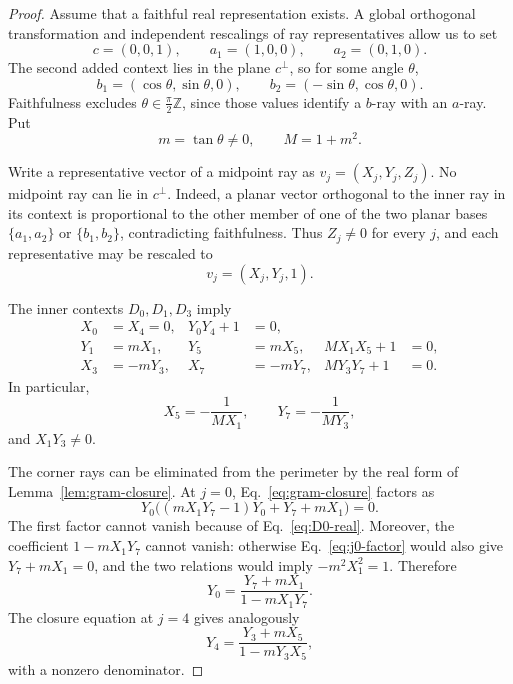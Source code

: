 \documentclass[12pt,a4paper]{article}
\theoremstyle{definition}
\theoremstyle{remark}
\begin{document}
\begin{proof}
Assume that a faithful real representation exists.  A global orthogonal
transformation and independent rescalings of ray representatives allow
us to set
\begin{equation}
 c=(0,0,1),\qquad a_1=(1,0,0),\qquad a_2=(0,1,0).
 \label{eq:real-normal-a}
\end{equation}
The second added context lies in the plane $c^\perp$, so for some angle
$\theta$,
\begin{equation}
 b_1=(\cos\theta,\sin\theta,0),\qquad
 b_2=(-\sin\theta,\cos\theta,0).
 \label{eq:real-normal-b}
\end{equation}
Faithfulness excludes $\theta\in\frac{\pi}{2}\mathbb Z$, since those
values identify a $b$-ray with an $a$-ray.  Put
\begin{equation}
 m=\tan\theta\ne0,\qquad M=1+m^2.
 \label{eq:mM}
\end{equation}

Write a representative vector of a midpoint ray as
$v_j=(X_j,Y_j,Z_j)$.  No midpoint ray can lie in $c^\perp$.
Indeed, a planar vector orthogonal to the inner ray in its
context is proportional to the other member of one of the two planar
bases $\{a_1,a_2\}$ or $\{b_1,b_2\}$, contradicting faithfulness.
Thus $Z_j\ne0$ for every $j$, and each representative may be rescaled to
\begin{equation}
 v_j=(X_j,Y_j,1).
 \label{eq:affine-midpoints}
\end{equation}

The inner contexts $D_0,D_1,D_3$ imply
\begin{align}
 X_0&=X_4=0,&Y_0Y_4+1&=0,
 \label{eq:D0-real}\\
 Y_1&=mX_1,&Y_5&=mX_5,&MX_1X_5+1&=0,
 \label{eq:D1-real}\\
 X_3&=-mY_3,&X_7&=-mY_7,&MY_3Y_7+1&=0.
 \label{eq:D3-real}
\end{align}
In particular,
\begin{equation}
 X_5=-\frac1{MX_1},\qquad
 Y_7=-\frac1{MY_3},
 \label{eq:X5Y7}
\end{equation}
and $X_1Y_3\ne0$.

The corner rays can be eliminated from the perimeter by the real form
of Lemma~\ref{lem:gram-closure}.  At $j=0$,
Eq.~\eqref{eq:gram-closure} factors as
\begin{equation}
 Y_0\bigl((mX_1Y_7-1)Y_0+Y_7+mX_1\bigr)=0.
 \label{eq:j0-factor}
\end{equation}
The first factor cannot vanish because of Eq.~\eqref{eq:D0-real}.
Moreover, the coefficient $1-mX_1Y_7$ cannot vanish: otherwise
Eq.~\eqref{eq:j0-factor} would also give $Y_7+mX_1=0$, and the two
relations would imply $-m^2X_1^2=1$.  Therefore
\begin{equation}
 Y_0=\frac{Y_7+mX_1}{1-mX_1Y_7}.
 \label{eq:Y0-first}
\end{equation}
The closure equation at $j=4$ gives analogously
\begin{equation}
 Y_4=\frac{Y_3+mX_5}{1-mY_3X_5},
 \label{eq:Y4-first}
\end{equation}
with a nonzero denominator.


\end{proof}
\end{document}
